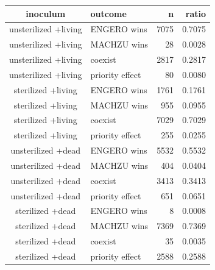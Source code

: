 \begin{table}[t]
\fontsize{12.0pt}{14.4pt}\selectfont
\begin{tabular*}{\linewidth}{@{\extracolsep{\fill}}clrr}
\toprule
inoculum & outcome & n & ratio \\ 
\midrule\addlinespace[2.5pt]
unsterilized
+living & ENGERO wins & 7075 & 0.7075 \\ 
unsterilized
+living & MACHZU wins & 28 & 0.0028 \\ 
unsterilized
+living & coexist & 2817 & 0.2817 \\ 
unsterilized
+living & priority effect & 80 & 0.0080 \\ 
sterilized
+living & ENGERO wins & 1761 & 0.1761 \\ 
sterilized
+living & MACHZU wins & 955 & 0.0955 \\ 
sterilized
+living & coexist & 7029 & 0.7029 \\ 
sterilized
+living & priority effect & 255 & 0.0255 \\ 
unsterilized
+dead & ENGERO wins & 5532 & 0.5532 \\ 
unsterilized
+dead & MACHZU wins & 404 & 0.0404 \\ 
unsterilized
+dead & coexist & 3413 & 0.3413 \\ 
unsterilized
+dead & priority effect & 651 & 0.0651 \\ 
sterilized
+dead & ENGERO wins & 8 & 0.0008 \\ 
sterilized
+dead & MACHZU wins & 7369 & 0.7369 \\ 
sterilized
+dead & coexist & 35 & 0.0035 \\ 
sterilized
+dead & priority effect & 2588 & 0.2588 \\ 
\bottomrule
\end{tabular*}
\end{table}

